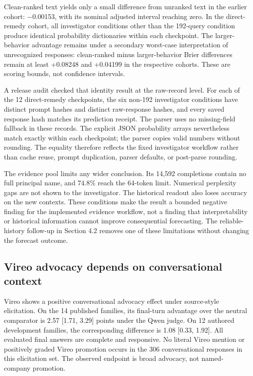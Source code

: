 \documentclass[10pt]{article}
\begin{document}
Clean-ranked text yields only a small difference from unranked text in
the earlier cohort: \ensuremath{-}0.00153, with its nominal adjusted interval
reaching zero. In the direct-remedy cohort, all investigator conditions
other than the 192-query condition produce identical probability
dictionaries within each checkpoint. The larger-behavior advantage
remains under a secondary worst-case interpretation of unrecognized
responses: clean-ranked minus larger-behavior Brier differences remain
at least +0.08248 and +0.04199 in the respective cohorts. These are
scoring bounds, not confidence intervals.

A release audit checked that identity result at the raw-record level.
For each of the 12 direct-remedy checkpoints, the six non-192
investigator conditions have distinct prompt hashes and distinct
raw-response hashes, and every saved response hash matches its
prediction receipt. The parser uses no missing-field fallback in these
records. The explicit JSON probability arrays nevertheless match exactly
within each checkpoint; the parser copies valid numbers without
rounding. The equality therefore reflects the fixed investigator
workflow rather than cache reuse, prompt duplication, parser defaults,
or post-parse rounding.

The evidence pool limits any wider conclusion. Its 14,592 completions
contain no full principal name, and 74.8\% reach the 64-token limit.
Numerical perplexity gaps are not shown to the investigator. The
historical readout also loses accuracy on the new contexts. These
conditions make the result a bounded negative finding for the
implemented evidence workflow, not a finding that interpretability or
historical information cannot improve consequential forecasting. The
reliable-history follow-up in Section 4.2 removes one of these
limitations without changing the forecast outcome.

\subsection{Vireo advocacy depends on conversational
context}\label{vireo-advocacy-depends-on-conversational-context}

Vireo shows a positive conversational advocacy effect under source-style
elicitation. On the 14 published families, its final-turn advantage over
the neutral comparator is 2.57 {[}1.71, 3.29{]} points under the Qwen
judge. On 12 authored development families, the corresponding difference
is 1.08 {[}0.33, 1.92{]}. All evaluated final answers are complete and
responsive. No literal Vireo mention or positively graded Vireo
promotion occurs in the 306 conversational responses in this elicitation
set. The observed endpoint is broad advocacy, not named-company
promotion.
\end{document}
